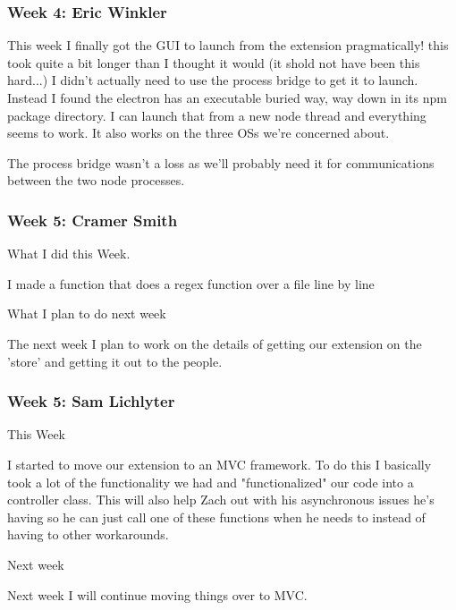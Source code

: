  \subsubsection{Week 4: Eric Winkler}

This week I finally got the GUI to launch from the extension pragmatically! this took quite a bit longer than I thought it would (it shold not have been this hard...) I didn't actually need to use the process bridge to get it to launch. Instead I found the electron has an executable buried way, way down in its npm package directory. I can launch that from a new node thread and everything seems to work. It also works on the three OSs we're concerned about. 



The process bridge wasn't a loss as we'll probably need it for communications between the two node processes. \\ 

 \subsubsection{Week 5: Cramer Smith}

What I did this Week.



I made a function that does a regex function over a file line by line



What I plan to do next week



The next week I plan to work on the details of getting our extension on the 'store' and getting it out to the people.  \\ 

 \subsubsection{Week 5: Sam Lichlyter}

This Week

I started to move our extension to an MVC framework. To do this I basically took a lot of the functionality we had and "functionalized" our code into a controller class. This will also help Zach out with his asynchronous issues he's having so he can just call one of these functions when he needs to instead of having to other workarounds.



Next week

Next week I will continue moving things over to MVC.  \\ 

